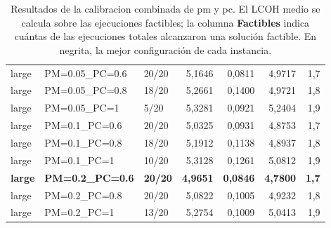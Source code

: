 \begin{table}[H]
\begin{tabular}{lllrrrr}
        \hline
        large & PM=0.05\_PC=0.6 & 20/20 & 5,1646 & 0,0811 & 4,9717 & 1,7 \\
        large & PM=0.05\_PC=0.8 & 18/20 & 5,2661 & 0,1400 & 4,9721 & 1,8 \\
        large & PM=0.05\_PC=1 & 5/20 & 5,3281 & 0,0921 & 5,2404 & 1,9 \\
        large & PM=0.1\_PC=0.6 & 20/20 & 5,0325 & 0,0931 & 4,8753 & 1,7 \\
        large & PM=0.1\_PC=0.8 & 18/20 & 5,1912 & 0,1138 & 4,8937 & 1,8 \\
        large & PM=0.1\_PC=1 & 10/20 & 5,3128 & 0,1261 & 5,0812 & 1,9 \\
        \textbf{large} & \textbf{PM=0.2\_PC=0.6} & \textbf{20/20} & \textbf{4,9651} & \textbf{0,0846} & \textbf{4,7800} & \textbf{1,7} \\
        large & PM=0.2\_PC=0.8 & 20/20 & 5,0822 & 0,1005 & 4,9232 & 1,8 \\
        large & PM=0.2\_PC=1 & 13/20 & 5,2754 & 0,1009 & 5,0413 & 1,9 \\
        \hline
    \end{tabular}
    \caption{Resultados de la calibracion combinada de pm y pc. El LCOH medio se calcula sobre las ejecuciones factibles; la columna \textbf{Factibles} indica cuántas de las ejecuciones totales alcanzaron una solución factible. En negrita, la mejor configuración de cada instancia.}
    \label{tab:calib_e03_pmpc}
\end{table}
